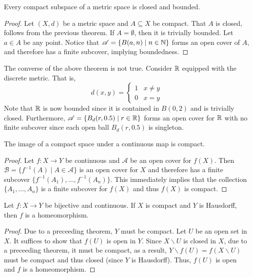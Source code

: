 \begin{theorem}
    Every compact subspace of a metric space is closed and bounded.
\end{theorem}
\begin{proof}
    Let $(X,d)$ be a metric space and $A\subseteq X$ be compact. That $A$ is closed, follows from the previous theorem. If $A = \emptyset$, then it is trivially bounded. Let $a\in A$ be any point. Notice that $\mathscr{A} = \{B(a,n)\mid n\in\mathbb{N}\}$ forms an open cover of $A$, and therefore has a finite subcover, implying boundedness.
\end{proof}

\begin{mdframed}[]
    The converse of the above theorem is not true. Consider $\mathbb{R}$ equipped with the discrete metric. That is, 
    \begin{equation*}
        d(x,y) = 
        \begin{cases}
            1 & x \ne y\\
            0 & x = y
        \end{cases}
    \end{equation*}
    Note that $\mathbb{R}$ is now bounded since it is contained in $B(0,2)$ and is trivially closed. Furthermore, $\mathscr{A} = \{B_d(r,0.5)\mid r\in\mathbb{R}\}$ forms an open cover for $\mathbb{R}$ with no finite subcover since each open ball $B_d(r,0.5)$ is singleton.
\end{mdframed}

\begin{theorem}
    The image of a compact space under a continuous map is compact.
\end{theorem}
\begin{proof}
    Let $f:X\to Y$ be continuous and $\mathscr{A}$ be an open cover for $f(X)$. Then $\mathscr{B} = \{f^{-1}(A)\mid A\in\mathscr{A}\}$ is an open cover for $X$ and therefore has a finite subcover $\{f^{-1}(A_1),\ldots,f^{-1}(A_n)\}$. This immediately implies that the collection $\{A_1,\ldots,A_n\}$ is a finite subcover for $f(X)$ and thus $f(X)$ is compact.
\end{proof}

\begin{theorem}
    Let $f:X\to Y$ be bijective and continuous. If $X$ is compact and $Y$ is Hausdorff, then $f$ is a homeomorphism.
\end{theorem}
\begin{proof}
    Due to a preceeding theorem, $Y$ must be compact. Let $U$ be an open set in $X$. It suffices to show that $f(U)$ is open in $Y$. Since $X\backslash U$ is closed in $X$, due to a preceeding theorem, it must be compact, as a result, $Y\backslash f(U) = f(X\backslash U)$ must be compact and thus closed (since $Y$ is Hausdorff). Thus, $f(U)$ is open and $f$ is a homeomorphism.
\end{proof}

